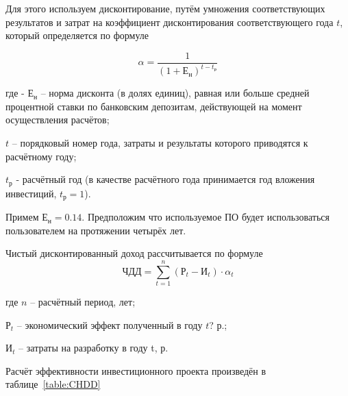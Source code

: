 Для этого используем дисконтирование, путём умножения соответствующих
результатов и затрат на коэффициент дисконтирования соответствующего года $t$,
который определяется по формуле

\begin{equation}
	\alpha = \frac{\num{1}}{(\num{1} + \text{Е}_\text{н})^{t - t_\text{р}}}
\end{equation}
\begin{explanationx}
	\item[где] - $\text{Е}_\text{н}$ -- норма дисконта (в долях единиц), равная
		или больше средней процентной ставки по банковским депозитам,
		действующей на момент осуществления расчётов;
	\item $t$ -- порядковый номер года, затраты и результаты которого приводятся
		к расчётному году;
	\item $t_\text{р}$ - расчётный год (в качестве расчётного года принимается
		год вложения инвестиций, $t_\text{р} = \num{1}$).
\end{explanationx}

\def \stavkaBankov {0.1376}
Примем $\text{Е}_\text{н} = \num{0.14}$.
Предположим что используемое ПО будет использоваться пользователем на протяжении
четырёх лет.

Чистый дисконтированный доход рассчитывается по формуле
\begin{equation}
	\text{ЧДД} = \sum^{n}_{t = 1} (\text{Р}_t - \text{И}_t) \cdot \alpha_t
\end{equation}
\begin{explanationx}
	\item[где] $n$ -- расчётный период, лет;
	\item $\text{Р}_t$ -- экономический эффект полученный в году $t$? р.;
	\item $\text{И}_t$ -- затраты на разработку в году t, р.
\end{explanationx}

Расчёт эффективности инвестиционного проекта произведён в таблице~\ref{table:CHDD}

